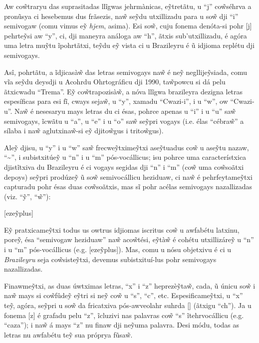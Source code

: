 \documentclass[12pt, a5paper, titlepage]{article}
\begin{document}
\begin{bilingualpages}
    Aw co\~wtraryu das suprasitadas llĩgwas jehrmànicas, e\~ytretãtu, u ``j''
    co\~wséhrva a pronũsya ci hesebemus dus frãsezis, na\~w se\~ydu utxillizadu
    para u so\~w dji ``i'' semivogaw (comu vimus e\~y \textit{hjem}, asima). Esi
    so\~w, cuju fonema denóta-si pohr [j] pehrte\~ysi aw ``y'', ci, dji maneyra
    análoga aw ``h'', ãtxis sub'utxillizadu, é agóra uma letra mu\~ytu ĩpohrtãtxi,
    te\~ydu e\~y vista ci u Brazileyru é ũ idjioma replétu dji semivogays.

    Asî, pohrtãtu, a ĩdjicasà\~w das letras semivogays na\~w é ne\~y
    negllije\~ysiada, comu vĩa se\~ydu deysdji u Acohrdu Ohrtográficu dji 1990,
    ta\~wpowcu si dá pelu ãtxicwadu ``Trema''. E\~y co\~wtrapozisà\~w, a nóva
    llĩgwa brazileyra dezigna letras espesíficas para esi fĩ, cways seja\~w, u
    ``y'', xamadu ``Cwazi-i'', i u ``w'', ow ``Cwazi-u''. Na\~w é nesesaryu mays
    letras du ci ésas, pohrce apenas u ``i'' i u ``u'' sa\~w semivogays, ĩcwãtu u
    ``a'', u ``e'' i u ``o'' sa\~w se\~ypri vogays (i.e. élas ``cébra\~w'' a sílaba
    i na\~w aglutxina\~w-si e\~y djito\~wgus i trito\~wgus).

    Ale\~y djisu, u ``y'' i u ``w'' sa\~w frecwe\~ytxime\~ytxi ase\~ytuadus co\~w u
    ase\~ytu nazaw, ``\textasciitilde'', i subistxitúe\~y u ``n'' i u ``m''
    pós-vocállicus; isu pohrce uma característxica djistĩtxiva du Brazileyru é ci
    vogays segidas dji ``n'' i ``m'' (co\~w uma co\~wsoãtxi depoys) se\~ypri
    prodúze\~y ũ so\~w semivocállicu heziduaw, ci na\~w é pehrfeytame\~ytxi
    capturadu pohr ésas duas co\~wsoãtxis, mas sĩ pohr acélas semivogays
    nazallizadas (viz. ``\~y'', ``\~w''):

    [eze\~yplus]

    E\~y pratxicame\~ytxi todus us owtrus idjiomas iscritus co\~w u awfabétu
    latxinu, pore\~y, ésa ``semivogaw heziduaw'' na\~w aco\~wtési, e\~ytà\~w é
    cohétu utxillizáre\~y u ``n'' i u ``m'' pós-vocállicus (e.g. [eze\~yplus]).
    Mas, comu u nósu objetxivu é ci u \textit{Brazileyru} seja co\~wsiste\~ytxi,
    devemus subistxituí-lus pohr semivogays nazallizadas.

    Finawme\~ytxi, as duas úwtximas letras, ``x'' i ``z'' heprezè\~yta\~w, cada, ũ
    únicu so\~w i na\~w mays si co\~wfûde\~y e\~ytri si ne\~y co\~w u ``s'', ``c'',
    etc. Espesificame\~ytxi, u ``x'' te\~y, agóra, se\~ypri u so\~w da fricatxiva
    pós-awveolahr suhrda [\textesh] (ãtxigu ``ch''). Ja u fonema [z] é grafadu pelu
    ``z'', ĩcluzivi nas palavras co\~w ``s'' ĩtehrvocállicu (e.g. ``caza''); i
    na\~w á mays ``z'' nu finaw dji ne\~yuma palavra. Desi módu, todas as letras nu
    awfabétu te\~y sua próprya fũsa\~w.


\end{bilingualpages}
\end{document}
